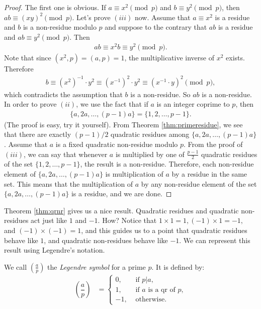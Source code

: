 \documentclass[12pt]{subfile}
\begin{document}
	\begin{proof}
		The first one is obvious. If $a \equiv x^2 \pmod p$ and $b\equiv y^2 \pmod p$, then $ab \equiv (xy)^2 \pmod p$. 
		Let's prove $(iii)$ now. Assume that $a \equiv x^2$ is a residue and $b$ is a non-residue modulo $p$ and suppose to the contrary that $ab$ is a residue and $ab \equiv y^2 \pmod p$. Then
		\begin{align*}
			ab \equiv x^2b \equiv y^2 \pmod p.
		\end{align*}
		Note that since $(x^2,p)=(a,p)=1$, the multiplicative inverse of $x^2$ exists. Therefore
		\begin{align*}
			b \equiv (x^2)^{-1} \cdot y^2 \equiv (x^{-1})^2 \cdot y^2 \equiv (x^{-1} \cdot y)^2 \pmod p,
		\end{align*}
		which contradicts the assumption that $b$ is a non-residue. So $ab$ is a non-residue.
		In order to prove $(ii)$, we use the fact that if $a$ is an integer coprime to $p$, then
		\begin{align*}
			\{a,2a,\ldots,(p-1)a\} = \{ 1,2,\ldots,p-1\}.
		\end{align*}
		(The proof is easy, try it yourself). From Theorem \ref{thm:primeresidue}, we see that there are exactly   $(p-1)/2$ quadratic residues among $\{a,2a,\ldots,(p-1)a\}$. Assume that $a$ is a fixed quadratic non-residue modulo $p$. From the proof of $(iii)$, we can say that whenever $a$ is multiplied by one of $\displaystyle \frac{p-1}{2}$ quadratic residues of the set $\{ 1,2,\ldots,p-1\}$, the result is a non-residue. Therefore, each non-residue element of $\{a,2a,\ldots,(p-1)a\}$ is multiplication of $a$ by a residue in the same set. This means that the multiplication of $a$ by any non-residue element of the set $\{a,2a,\ldots,(p-1)a\}$ is a residue, and we are done.
	\end{proof}
	
	Theorem \ref{thm:qrnr} gives us a nice result. Quadratic residues and quadratic non-residues act just like $1$ and $-1$. How? Notice that $1 \times 1 =1, (-1) \times 1 =-1,$ and $(-1) \times (-1)=1$, and this guides us to a point that quadratic residues behave like $1$, and quadratic non-residues behave like $-1$. %
	We can represent this result using Legendre's notation.
	
	\begin{definition}
		We call $\left(\frac{a}{p}\right)$ the {\it Legendre symbol} for a prime $p$. It is defined by:
		\begin{align*}
			\left(\dfrac{a}{p}\right) 
			& = 
			\begin{cases}
				0,& \mbox{ if }p|a,\\
				1, &\mbox{ if }a\mbox{ is a qr of }p,\\
				-1, &\mbox{ otherwise}.
			\end{cases}
		\end{align*}
		
	\end{definition}
	
\end{document}
